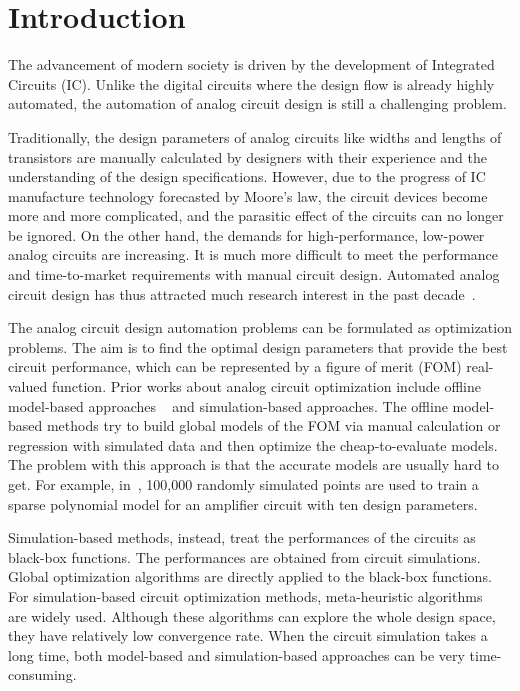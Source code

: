 \section{Introduction}

%
The advancement of modern society is driven by the development of Integrated
Circuits (IC). Unlike the digital circuits where the design flow is already
highly automated, the automation of analog circuit design is still a
challenging problem.

Traditionally, the design parameters of analog circuits like widths and lengths of
transistors are manually calculated by designers with their experience and the
understanding of the design specifications. However, due to the progress of IC
manufacture technology forecasted by Moore's law, the circuit devices become
more and more complicated, and the parasitic effect of the circuits can no
longer be ignored. On the other hand, the demands for high-performance,
low-power analog circuits are increasing. It is much more difficult to
meet the performance and time-to-market requirements with manual circuit design.
Automated analog circuit design has thus attracted much research interest in
the past decade~\cite{rutenbar2007hierarchical}.

The analog circuit design automation problems can be formulated as optimization
problems. The aim is to find the optimal design parameters that provide the
best circuit performance, which can be represented by a figure of merit (FOM)
real-valued function. Prior works about analog circuit optimization
include offline model-based approaches
~\cite{colleran2003optimization,daems2003simulation,wang2014enabling} and
simulation-based approaches. The offline model-based methods try to build
global models of the FOM via manual calculation or regression with simulated
data and then optimize the cheap-to-evaluate models. The problem with this
approach is that the accurate models are usually hard to get. For example,
in~\citet{wang2014enabling}, 100,000 randomly simulated points are used to train
a sparse polynomial model for an amplifier circuit with ten design parameters.

Simulation-based methods, instead, treat the performances of the circuits as black-box functions. The performances are obtained from circuit simulations. Global optimization
algorithms are directly applied to the black-box functions. For
simulation-based circuit optimization methods, meta-heuristic
algorithms~\cite{phelps2000anaconda, liu2009analog} are widely used. Although
these algorithms can explore the whole design space, they have relatively low
convergence rate. When the circuit simulation takes a long time, both
model-based and simulation-based approaches can be very time-consuming.

